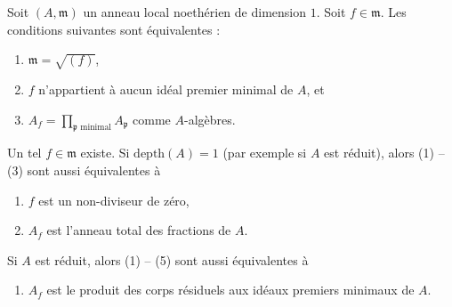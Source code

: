 \begin{lemma}
\label{lemma-pre-pre-delta-invariant}
Soit $(A, \mathfrak m)$ un anneau local noethérien de dimension $1$.
Soit $f \in \mathfrak m$. Les conditions suivantes sont équivalentes :
\begin{enumerate}
\item $\mathfrak m = \sqrt{(f)}$,
\item $f$ n'appartient à aucun idéal premier minimal de $A$, et
\item $A_f = \prod_{\mathfrak p\text{ minimal}} A_\mathfrak p$ comme $A$-algèbres.
\end{enumerate}
Un tel $f \in \mathfrak m$ existe. Si $\text{depth}(A) = 1$ (par exemple si
$A$ est réduit), alors (1) -- (3) sont aussi équivalentes à
\begin{enumerate}
\item[(4)] $f$ est un non-diviseur de zéro,
\item[(5)] $A_f$ est l'anneau total des fractions de $A$.
\end{enumerate}
Si $A$ est réduit, alors (1) -- (5) sont aussi équivalentes à
\begin{enumerate}
\item[(6)] $A_f$ est le produit des corps résiduels aux idéaux
premiers minimaux de $A$.
\end{enumerate}
\end{lemma}

